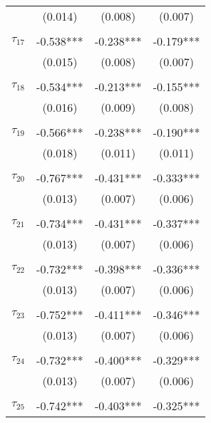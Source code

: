 \begin{tabular}{@{\extracolsep{-0pt}}lccc}
                &  (0.014)  &  (0.008)  &  (0.007)  \\
                &           &           &           \\[-2.1ex]
$\tau_{17}$     & -0.538*** & -0.238*** & -0.179*** \\
                &  (0.015)  &  (0.008)  &  (0.007)  \\
                &           &           &           \\[-2.1ex]
$\tau_{18}$     & -0.534*** & -0.213*** & -0.155*** \\
                &  (0.016)  &  (0.009)  &  (0.008)  \\
                &           &           &           \\[-2.1ex]
$\tau_{19}$     & -0.566*** & -0.238*** & -0.190*** \\
                &  (0.018)  &  (0.011)  &  (0.011)  \\
                &           &           &           \\[-2.1ex]
$\tau_{20}$     & -0.767*** & -0.431*** & -0.333*** \\
                &  (0.013)  &  (0.007)  &  (0.006)  \\
                &           &           &           \\[-2.1ex]
$\tau_{21}$     & -0.734*** & -0.431*** & -0.337*** \\
                &  (0.013)  &  (0.007)  &  (0.006)  \\
                &           &           &           \\[-2.1ex]
$\tau_{22}$     & -0.732*** & -0.398*** & -0.336*** \\
                &  (0.013)  &  (0.007)  &  (0.006)  \\
                &           &           &           \\[-2.1ex]
$\tau_{23}$     & -0.752*** & -0.411*** & -0.346*** \\
                &  (0.013)  &  (0.007)  &  (0.006)  \\
                &           &           &           \\[-2.1ex]
$\tau_{24}$     & -0.732*** & -0.400*** & -0.329*** \\
                &  (0.013)  &  (0.007)  &  (0.006)  \\
                &           &           &           \\[-2.1ex]
$\tau_{25}$     & -0.742*** & -0.403*** & -0.325*** \\

\end{tabular}
